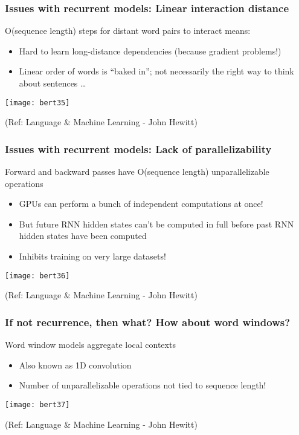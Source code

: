 \begin{frame}[fragile]\frametitle{Issues with recurrent models: Linear interaction distance}

O(sequence length) steps for distant word pairs to interact means:

\begin{itemize}
\item Hard to learn long-distance dependencies (because gradient problems!)
\item Linear order of words is ``baked in''; not necessarily the  right way to think about sentences \ldots
\end{itemize}	 

\begin{center}
\texttt{[image: bert35]}
\end{center}	

 
{\tiny (Ref: Language \& Machine Learning - John Hewitt)}
\end{frame}

\begin{frame}[fragile]\frametitle{Issues with recurrent models: Lack of parallelizability}

Forward and backward passes have O(sequence length) unparallelizable operations

\begin{itemize}
\item GPUs can perform a bunch of independent computations at once!
\item But future RNN hidden states can’t be computed in full before past RNN
hidden states have been computed
\item Inhibits training on very large datasets!
\end{itemize}	 

\begin{center}
\texttt{[image: bert36]}
\end{center}	

 
{\tiny (Ref: Language \& Machine Learning - John Hewitt)}
\end{frame}

\begin{frame}[fragile]\frametitle{If not recurrence, then what? How about word windows?}

Word window models aggregate local contexts

\begin{itemize}
\item Also known as 1D convolution
\item Number of unparallelizable operations not tied to sequence length!
\end{itemize}	 

\begin{center}
\texttt{[image: bert37]}
\end{center}	

 
{\tiny (Ref: Language \& Machine Learning - John Hewitt)}
\end{frame}

